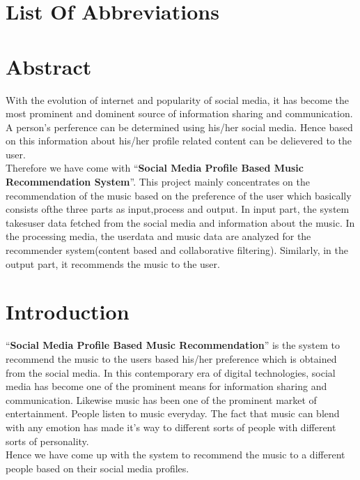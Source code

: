\documentclass{article}
\begin{document}
\tableofcontents
\thispagestyle{empty}
\cleardoublepage

\listoftables
\thispagestyle{empty}
\cleardoublepage

\listoffigures
\thispagestyle{empty}
\cleardoublepage

\section*{List Of Abbreviations}
\thispagestyle{empty}
\cleardoublepage

\section*{Abstract}
With the evolution of internet and popularity of social media, it has become the most prominent and dominent source of information sharing and communication. A person's perference can be determined using his/her social media. Hence based on this information about his/her profile related content can be delievered to the user.\\
Therefore we have come with ``\textbf{Social Media Profile Based Music Recommendation System}''. This project mainly concentrates on the recommendation of the music based on the preference of the user which basically consists ofthe three parts as input,process and output. In input part, the system takesuser data fetched from the social media and information about the music. In the processing media, the userdata and music data are analyzed for the recommender system(content based and collaborative filtering). Similarly, in the output part, it recommends the music to the user.
\thispagestyle{empty}
\cleardoublepage
{}
\section{Introduction}
	``\textbf{Social Media Profile Based Music Recommendation}'' is the system to recommend the music to the users based his/her preference which is obtained from the social media. In this contemporary era of digital technologies, social media has become one of the prominent means for information sharing and communication. Likewise music has been one of the prominent market of entertainment. People listen to music everyday. The fact that music can blend with any emotion has made it's way to different sorts of people with different sorts of personality.\\
	Hence we have come up with the system to recommend the music to a different people based on their social media profiles.
\cleardoublepage
\end{document}
